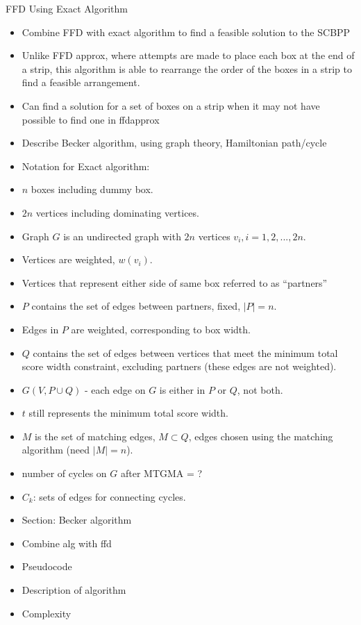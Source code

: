 \documentclass{llncs}
\begin{document}
FFD Using Exact Algorithm
\begin{itemize}
	\item Combine FFD with exact algorithm to find a feasible solution to the SCBPP
	\item Unlike FFD approx, where attempts are made to place each box at the end of a strip, this algorithm is able to rearrange the order of the boxes in a strip to find a feasible arrangement.
	\item Can find a solution for a set of boxes on a strip when it may not have possible to find one in ffdapprox
	\item Describe Becker algorithm, using graph theory, Hamiltonian path/cycle
	\item Notation for Exact algorithm:
	\item $n$ boxes including dummy box.
	\item $2n$ vertices including dominating vertices.
	\item Graph $G$ is an undirected graph with $2n$ vertices $v_i, i = 1, 2, ...,2n$.
	\item Vertices are weighted, $w(v_i)$.
	\item Vertices that represent either side of same box referred to as ``partners''
	\item $P$ contains the set of edges between partners, fixed, $|P| = n$.
	\item Edges in $P$ are weighted, corresponding to box width.
	\item $Q$ contains the set of edges between vertices that meet the minimum total score width constraint, excluding partners (these edges are not weighted).
	\item $G(V, P \cup Q)$ - each edge on $G$ is either in $P$ or $Q$, not both.
	\item $t$ still represents the minimum total score width.
	\item $M$ is the set of matching edges, $M \subset Q$, edges chosen using the matching algorithm (need $|M| = n$).
	\item number of cycles on $G$ after MTGMA =  ?
	\item $C_k$: sets of edges for connecting cycles.
	\item Section: Becker algorithm
	\item Combine alg with ffd
	\item Pseudocode
	\item Description of algorithm
	\item Complexity
\end{itemize}
\end{document}
